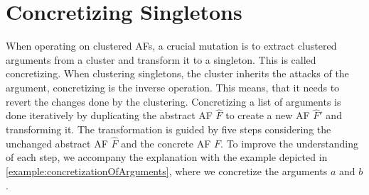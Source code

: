 \section{Concretizing Singletons}
\label{sec:ConcretizingSingletons}
When operating on clustered AFs, a crucial mutation is to extract clustered arguments from a cluster and transform it to a singleton. This is called concretizing. When clustering singletons, the cluster inherits the attacks of the argument, concretizing is the inverse operation. This means, that it needs to revert the changes done by the clustering.
Concretizing a list of arguments is done iteratively by duplicating the abstract AF $\hat{F}$ to create a new AF $\hat{F}'$ and transforming it. The transformation is guided by five steps considering the unchanged abstract AF $\hat{F}$ and the concrete AF $F$. To improve the understanding of each step, we accompany the explanation with the example depicted in \cref{example:concretizationOfArguments}, where we concretize the arguments $a$ and $b$.

\vspace{0.3cm}

